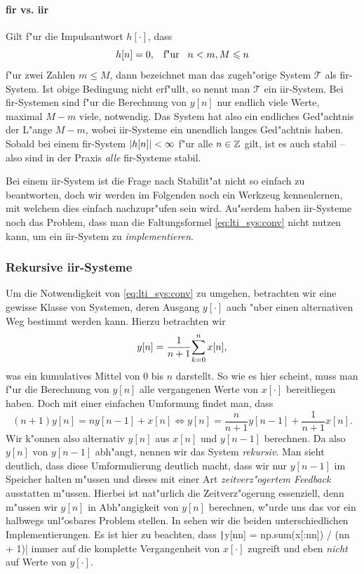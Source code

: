 \paragraph{\texorpdfstring{\acrshort{fir}}{FIR} vs. \texorpdfstring{\acrshort{iir}}{IIR}}
%
Gilt f"ur die Impulsantwort $h[\cdot]$, dass
\[
h[n] = 0, {\hspace{3mm} \text{f"ur} \hspace{3mm}} n < m, M \leqslant n
\]
f"ur zwei Zahlen $m \leqslant M$, dann bezeichnet man das zugeh"orige System $\mathcal{T}$ als \gls{fir}-System.
Ist obige Bedingung nicht erf"ullt, so nennt man $\mathcal{T}$ ein \gls{iir}-System.
Bei \gls{fir}-Systemen sind f"ur die Berechnung von $y[n]$ nur endlich viele Werte, maximal $M - m$ viele, notwendig.
Das System hat also ein endliches Ged"achtnis der L"ange $M - m$, wobei \gls{iir}-Systeme ein unendlich langes Ged"achtnis haben.
Sobald bei einem \gls{fir}-System ${\left| h[n] \right|} < \infty$ f"ur alle $n \in \mathbb{Z}$ gilt, ist es auch stabil -- also sind in der Praxis \emph{alle} \gls{fir}-Systeme stabil.

Bei einem \gls{iir}-System ist die Frage nach Stabilit"at nicht so einfach zu beantworten, doch wir werden im Folgenden noch ein Werkzeug kennenlernen, mit welchem dies einfach nachzupr"ufen sein wird.
Au"serdem haben \gls{iir}-Systeme noch das Problem, dass man die Faltungsformel \eqref{eq:lti_sys:conv} nicht nutzen kann, um ein \gls{iir}-System zu \emph{implementieren}.
%
%
\subsubsection{Rekursive \texorpdfstring{\acrshort{iir}}{IIR}-Systeme}
%
%
Um die Notwendigkeit von \eqref{eq:lti_sys:conv} zu umgehen, betrachten wir eine gewisse Klasse von Systemen, deren Ausgang $y[\cdot]$ auch "uber einen alternativen Weg bestimmt werden kann.
Hierzu betrachten wir
\[
y[n] = \frac{1}{n+1}{\sum\limits_{k=0}^{n}{x[n]}},
\]
was ein kumulatives Mittel von $0$ bis $n$ darstellt.
So wie es hier scheint, muss man f"ur die Berechnung von $y[n]$ alle vergangenen Werte von $x[\cdot]$ bereitliegen haben.
Doch mit einer einfachen Umformung findet man, dass
\[
(n+1)y[n] = n y[n-1] + x[n] 
\Leftrightarrow 
y[n] = \frac{n}{n+1} y[n-1] + \frac{1}{n+1} x[n].
\]
Wir k"onnen also alternativ $y[n]$ aus $x[n]$ und $y[n-1]$ berechnen.
Da also $y[n]$ von $y[n-1]$ abh"angt, nennen wir das System \emph{rekursiv}.
Man sieht deutlich, dass diese Umformulierung deutlich macht, dass wir nur $y[n-1]$ im Speicher halten m"ussen und dieses mit einer Art \emph{zeitverz"ogertem Feedback} ausstatten m"ussen.
Hierbei ist nat"urlich die Zeitverz"ogerung essenziell, denn m"ussen wir $y[n]$ in Abh"angigkeit von $y[n]$ berechnen, w"urde uns das vor ein halbwegs unl"osbares Problem stellen.
In  sehen wir die beiden unterschiedlichen Implementierungen.
Es ist hier zu beachten, dass \texttt|y[nn] = np.sum(x[:nn]) / (nn + 1)| immer auf die komplette Vergangenheit von $x[\cdot]$ zugreift und eben \emph{nicht} auf Werte von $y[\cdot]$.

